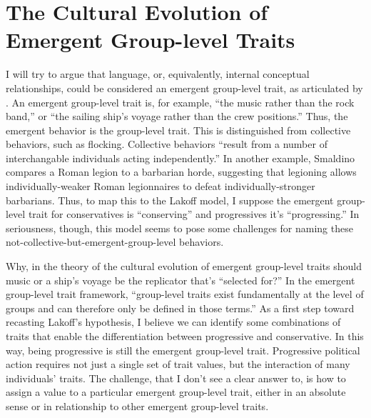 \documentclass[11pt,letterpaper]{article}
\begin{document}
\section{The Cultural Evolution of Emergent Group-level Traits}
\label{sec:smaldino-summary}

I will try to argue that language, or, equivalently, internal conceptual relationships,
could be considered an emergent group-level trait, as articulated by
. An emergent group-level trait is, for example, ``the
music rather than the rock band,'' or ``the sailing ship's voyage rather than
the crew positions.'' Thus, the emergent behavior is the group-level trait. 
This is distinguished from collective behaviors, such as flocking. Collective
behaviors ``result from a number of interchangable individuals acting
independently.'' In another example, Smaldino compares a Roman legion to 
a barbarian horde, suggesting that legioning allows individually-weaker
Roman legionnaires to defeat individually-stronger barbarians. Thus, to map
this to the Lakoff model, I suppose the emergent group-level trait 
for conservatives is ``conserving'' and progressives it's ``progressing.''
In seriousness, though, this model seems to pose some challenges for naming
these not-collective-but-emergent-group-level behaviors. 

Why, in the theory of the cultural evolution of emergent group-level traits
should music or a ship's voyage be the replicator that's ``selected for?'' 
In the emergent group-level trait framework, ``group-level traits
exist fundamentally at the level of groups and can therefore only be defined 
in those terms.'' As a first step toward recasting Lakoff's hypothesis, 
I believe we can identify some combinations of traits that enable
the differentiation between progressive and conservative. In this way, being
progressive is still the emergent group-level trait. Progressive 
political action requires not just a single set of trait values, but the
interaction of many individuals' traits. The challenge, that I don't see
a clear answer to, is how to assign a value to a particular
emergent group-level trait, either in an absolute sense or in relationship
to other emergent group-level traits. 
\end{document}
